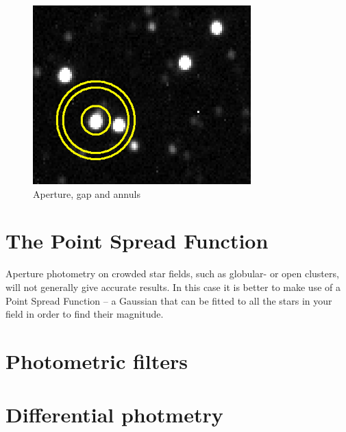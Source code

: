 \documentclass[12pt,twoside,a4paper]{report}
\begin{document}
 \begin{figure}[ht]
  \centering
    \includegraphics[width=0.75\textwidth]{documentation_images/annulus.png}
    \caption{\label{fig:annulus}Aperture, gap and annuls}
 \end{figure}

\section{The Point Spread Function}

Aperture photometry on crowded star fields, such as globular- or open clusters, will not generally give accurate results. In this case it is better to make use of a Point Spread Function -- a Gaussian that can be fitted to all the stars in your field in order to find their magnitude.


\section{Photometric filters}

\section{Differential photmetry}




\end{document}
